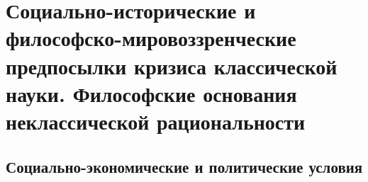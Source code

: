 

\section[Предпосылки кризиса классической науки. Философские основания неклассической рациональности]{Социально-исторические и философско-мировоззренческие предпосылки кризиса классической науки. Философские основания неклассической рациональности}

\subsection{Социально-экономические и политические условия}

